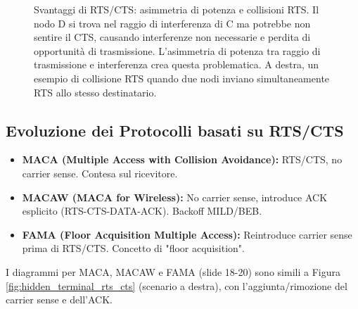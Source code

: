 \begin{figure}[H]
\caption{Svantaggi di RTS/CTS: asimmetria di potenza e collisioni RTS. Il nodo D si trova nel raggio di interferenza di C ma potrebbe non sentire il CTS, causando interferenze non necessarie e perdita di opportunità di trasmissione. L'asimmetria di potenza tra raggio di trasmissione e interferenza crea questa problematica. A destra, un esempio di collisione RTS quando due nodi inviano simultaneamente RTS allo stesso destinatario.}
\label{fig:rts_cts_drawbacks}
\end{figure}

\subsection{Evoluzione dei Protocolli basati su RTS/CTS}
\begin{itemize}
    \item \textbf{MACA (Multiple Access with Collision Avoidance):} RTS/CTS, no carrier sense. Contesa sul ricevitore.
    \item \textbf{MACAW (MACA for Wireless):} No carrier sense, introduce ACK esplicito (RTS-CTS-DATA-ACK). Backoff MILD/BEB.
    \item \textbf{FAMA (Floor Acquisition Multiple Access):} Reintroduce carrier sense prima di RTS/CTS. Concetto di "floor acquisition".
\end{itemize}
I diagrammi per MACA, MACAW e FAMA (slide 18-20) sono simili a Figura \ref{fig:hidden_terminal_rts_cts} (scenario a destra), con l'aggiunta/rimozione del carrier sense e dell'ACK.

